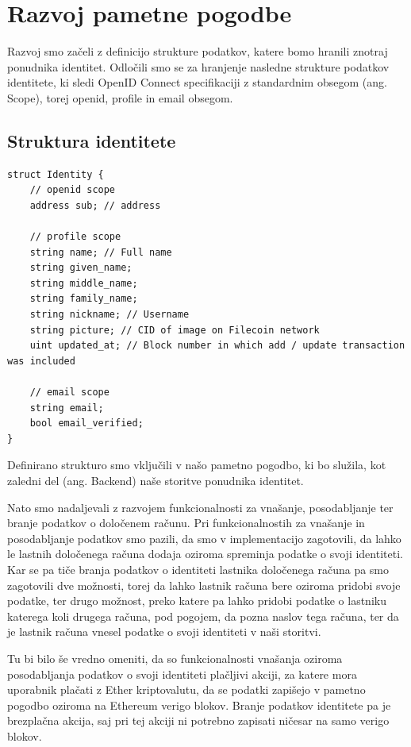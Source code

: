 \documentclass[a4paper,12pt,openright]{book}
\begin{document}
\section{Razvoj pametne pogodbe}
Razvoj smo začeli z definicijo strukture podatkov, katere bomo hranili znotraj ponudnika identitet.
Odločili smo se za hranjenje nasledne strukture podatkov identitete, ki sledi OpenID Connect specifikaciji \cite{openid_connect_scopes} 
z standardnim obsegom (ang. Scope), torej openid, profile in email obsegom.

\subsection{Struktura identitete}
\label{identity_struct}

\begin{verbatim}
struct Identity {
    // openid scope
    address sub; // address

    // profile scope
    string name; // Full name
    string given_name;
    string middle_name;
    string family_name;
    string nickname; // Username
    string picture; // CID of image on Filecoin network
    uint updated_at; // Block number in which add / update transaction was included

    // email scope
    string email;
    bool email_verified;
}
\end{verbatim}

Definirano strukturo smo vključili v našo pametno pogodbo, ki bo služila, kot zaledni del (ang. Backend) naše storitve ponudnika identitet.

Nato smo nadaljevali z razvojem funkcionalnosti za vnašanje, posodabljanje ter branje podatkov o določenem računu.
Pri funkcionalnostih za vnašanje in posodabljanje podatkov smo pazili, da smo v implementacijo zagotovili, da lahko le lastnih določenega računa dodaja oziroma spreminja podatke o svoji identiteti.
Kar se pa tiče branja podatkov o identiteti lastnika določenega računa pa smo zagotovili dve možnosti, torej da lahko lastnik računa bere oziroma pridobi svoje podatke, ter drugo možnost, preko katere pa lahko pridobi podatke o lastniku katerega koli drugega računa, pod pogojem, da pozna naslov tega računa, ter da je lastnik računa vnesel podatke o svoji identiteti v naši storitvi.

Tu bi bilo še vredno omeniti, da so funkcionalnosti vnašanja oziroma posodabljanja podatkov o svoji identiteti plačljivi akciji, za katere mora uporabnik plačati z Ether kriptovalutu, da se podatki zapišejo v pametno pogodbo oziroma na Ethereum verigo blokov.
Branje podatkov identitete pa je brezplačna akcija, saj pri tej akciji ni potrebno zapisati ničesar na samo verigo blokov.
\end{document}
